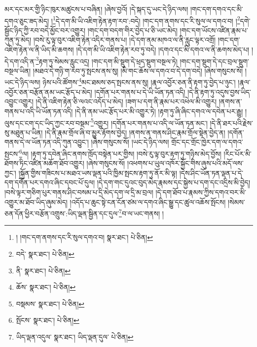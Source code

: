 མར་དང་མར་གྱི་ཉིང་ཁུར་མཚུངས་པ་བཞིན། །ཞེས་བྱའོ། །དེ་སྐད་དུ་ཡང་དེ་ཉིད་ལས། །གང་དག་དགའ་དང་མི་དགའ་ཅུང་ཟད་མེད། །\footnote{། །གང་དག་ནགས་དང་རི་སུལ་དགའ་བ།   སྣར་ཐང་།  པེ་ཅིན། }དེ་དག་མི་ཡི་འཇིག་རྟེན་རྟག་རབ་:བདེ། །གང་དག་ནགས་དང་རི་སུལ་ལ་དགའ་བ། །\footnote{བདེ་  སྣར་ཐང་།  པེ་ཅིན། }དགེ་སྦྱོང་ཉིད་ཀྱི་རབ་བདེ་མྱོང་བར་འགྱུར། །གང་དག་བདག་གིར་བྱེད་པ་ཅི་ཡང་མེད། །གང་དག་ཡོངས་འཛིན་རྣམ་པ་ཀུན་ཏུ་མེད། །བསེ་རུ་ལྟ་བུར་འཇིག་རྟེན་འདིར་གནས་པ། །དེ་དག་ནམ་མཁའ་ལ་ནི་རླུང་ལྟར་འགྲོ། །གང་དག་འཇིག་རྟེན་ལ་ནི་ཡིད་མི་ཆགས། །དེ་དག་མི་ཡི་འཇིག་རྟེན་རབ་ཏུ་བདེ། །དགའ་དང་མི་དགའ་ལ་ནི་ཆགས་མེད་པ། །དེ་དག་འདི་ན་\footnote{ནི་  སྣར་ཐང་།  པེ་ཅིན། }རྟག་ཏུ་སེམས་རླུང་འདྲ། །གང་དག་མི་སྡུག་དེ་ཕྲད་སྡུག་བསྔལ་ཏེ། །གང་དག་སྡུག་དེ་དང་བྲལ་སྡུག་བསྔལ་ཡིན། །མཐའ་དེ་གཉི་ག་རབ་ཏུ་སྤངས་ནས་སུ། །མི་གང་ཆོས་ལ་དགའ་བ་དེ་དག་བདེ། །ཞེས་གསུངས་སོ། །ཡང་དེ་ཉིད་ལས། ཉེས་པའི་ཚོགས་\footnote{ཆོས་  སྣར་ཐང་།  པེ་ཅིན། }མང་ཐམས་ཅད་སྤངས་ནས་སུ། །རྣལ་འབྱོར་ཅན་ནི་རྟག་ཏུ་བྱེད་པ་ཉུང་། །རྣལ་འབྱོར་ཅན་བརྩོན་ནམ་ཡང་རྩོད་པ་མེད། །དགོན་པར་གནས་པ་དེ་ཡི་ཡོན་ཏན་འདི། །དེ་ནི་རྟག་ཏུ་འདུས་བྱས་ཡིད་འབྱུང་འགྱུར། །དེ་ནི་འཇིག་རྟེན་ཅི་ལའང་འདོད་པ་མེད། །ཟག་པ་དག་ནི་རྣམ་པར་འཕེལ་མི་འགྱུར། །ནགས་ན་གནས་པ་འདི་ཡི་ཡོན་ཏན་འདི། །དེ་ནི་ནམ་ཡང་རྩོད་པར་མི་འགྱུར་ཏེ། །རྟག་ཏུ་ཞི་ཞིང་དགའ་ལ་དབེན་པར་རྒྱུ། །ལུས་དང་ངག་དང་ཡིད་ཀྱང་རབ་བསྡམ་\footnote{བསྡམས་  སྣར་ཐང་།  པེ་ཅིན། }འགྱུར། །དགོན་པར་གནས་པ་འདི་ལ་ཡོན་ཏན་མང་། །དེ་ནི་ཐར་པའི་རྗེས་སུ་མཐུན་པ་ཡིན། །དེ་ནི་རྣམ་གྲོལ་ཞི་བ་མྱུར་རྟོགས་བྱེད། །ནགས་ན་གནས་ཤིང་རྣམ་གྲོལ་སྟེན་བྱེད་ན། །དགོན་གནས་དེ་ལ་ཡོན་ཏན་འདི་ཀུན་འབྱུང་། །ཞེས་གསུངས་སོ། །ཡང་དེ་ཉིད་ལས། གྲོང་དང་གྲོང་ཁྱེར་དག་ལ་དགའ་སྤངས་\footnote{སྤོངས་  སྣར་ཐང་།  པེ་ཅིན། }ལ། །རྟག་ཏུ་དབེན་ཞིང་ནགས་ཁྲོད་བསྟེན་པར་གྱིས། །བསེ་རུ་ལྟ་བུར་རྟག་ཏུ་གཉིས་མེད་བྱོས། །རིང་པོར་མི་ཐོགས་ཏིང་འཛིན་མཆོག་ཐོབ་འགྱུར། །ཞེས་གསུངས་སོ། །འཕགས་པ་ཡུལ་འཁོར་སྐྱོང་གིས་ཞུས་པའི་མདོ་ལས་ཀྱང་། །སྐྱོན་གྱིས་གཟིངས་པ་མཐའ་ཡས་ལྡན་པའི་ཁྱིམ་སྤངས་རྟག་ཏུ་ནོར་མི་ལྟ། །དེས་ཤིང་ཡོན་ཏན་ལྡན་པ་དེ་དག་དགོན་པར་དགའ་ཞིང་དབང་པོ་དུལ། །དེ་དག་གང་དུའང་བུད་མེད་རྣམས་དང་སྐྱེས་པ་དག་དང་འདྲིས་མི་བྱེད། །བསེ་ལྟར་གཅིག་པུར་གནས་ཤིང་བསམ་པ་དྲི་མེད་དག་ལ་དྲི་མ་བྲལ། །དེ་དག་ཐོབ་པ་རྣམས་ཀྱིས་དགའ་བར་མི་འགྱུར་མ་ཐོབ་ཡིད་ཞུམ་མེད། །འདོད་པ་ཆུང་སྟེ་ངན་ངོན་ཙམ་ལ་དགའ་ཞིང་སྒྱུ་དང་ཚུལ་འཆོས་སྤོངས། །སེམས་ཅན་དོན་ཕྱིར་བརྩོན་འགྲུས་:ཡིད་ལྡན་སྦྱིན་དང་དུལ་\footnote{ཡིད་ལྡན་འདུལ་  སྣར་ཐང་། ཡིད་ལྡན་དུལ་  པེ་ཅིན། }བ་ལ་ཡང་གནས། །
